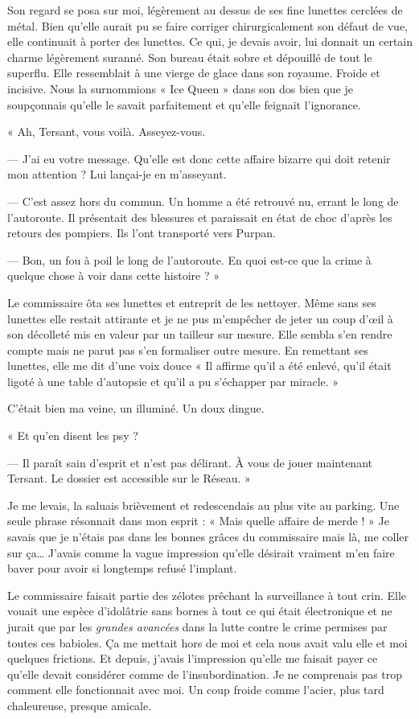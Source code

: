 Son regard se posa sur moi, légèrement au dessus de ses fine lunettes cerclées de métal. Bien qu'elle aurait pu se faire
corriger chirurgicalement son défaut de vue, elle continuait à porter des lunettes. Ce qui, je devais avoir, lui donnait
un certain charme légèrement suranné. Son bureau était sobre et dépouillé de tout le superflu. Elle ressemblait à une
vierge de glace dans son royaume. Froide et incisive. Nous la surnommions « Ice Queen » dans son dos bien que je
soupçonnais qu'elle le savait parfaitement et qu'elle feignait l'ignorance.

« Ah, Tersant, vous voilà. Asseyez-vous.

— J'ai eu votre message. Qu'elle est donc cette affaire bizarre qui doit retenir mon attention ? Lui lançai-je en
m'asseyant.

— C'est assez hors du commun. Un homme a été retrouvé nu, errant le long de l'autoroute. Il présentait des blessures et
paraissait en état de choc d'après les retours des pompiers. Ils l'ont transporté vers Purpan.

— Bon, un fou à poil le long de l'autoroute. En quoi est-ce que la crime à quelque chose à voir dans cette histoire ? »

Le commissaire ôta ses lunettes et entreprit de les nettoyer. Même sans ses lunettes elle restait attirante et je ne pus
m'empêcher de jeter un coup d'œil à son décolleté mis en valeur par un tailleur sur mesure. Elle sembla s'en rendre
compte mais ne parut pas s'en formaliser outre mesure. En remettant ses lunettes, elle me dit d'une voix douce « Il
affirme qu'il a été enlevé, qu'il était ligoté à une table d'autopsie et qu'il a pu s'échapper par miracle. »

C'était bien ma veine, un illuminé. Un doux dingue.

« Et qu'en disent les psy ?

— Il paraît sain d'esprit et n'est pas délirant. À vous de jouer maintenant Tersant. Le dossier est accessible sur le
Réseau. »

Je me levais, la saluais brièvement et redescendais au plus vite au parking. Une seule phrase résonnait dans mon
esprit : « Mais quelle affaire de merde ! » Je savais que je n'étais pas dans les bonnes grâces du commissaire mais là,
me coller sur ça… J'avais comme la vague impression qu'elle désirait vraiment m'en faire baver pour avoir si longtemps
refusé l'implant.

Le commissaire faisait partie des zélotes prêchant la surveillance à tout crin. Elle vouait une espèce d'idolâtrie sans
bornes à tout ce qui était électronique et ne jurait que par les \emph{grandes avancées} dans la lutte contre le crime
permises par toutes ces babioles. Ça me mettait hors de moi et cela nous avait valu elle et moi quelques frictions. Et
depuis, j'avais l'impression qu'elle me faisait payer ce qu'elle devait considérer comme de l'insubordination. Je ne
comprenais pas trop comment elle fonctionnait avec moi. Un coup froide comme l'acier, plus tard chaleureuse, presque
amicale.

